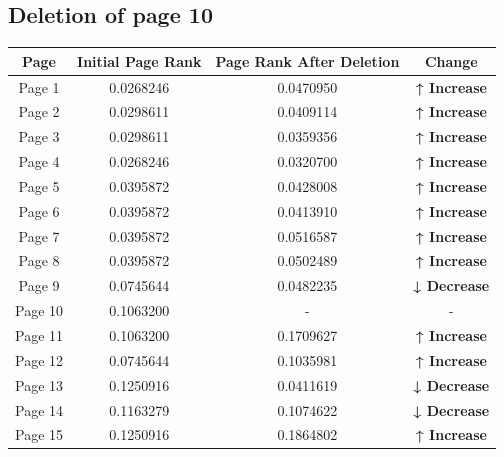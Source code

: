 \documentclass{article}
\begin{document}
\subsection{Deletion of page 10}
\vspace{0.3cm}

\begin{tabular}{|c|c|c|c|}
\hline
\textbf{Page} & \textbf{Initial Page Rank} & Page Rank After Deletion & \textbf{Change} \\
\hline
Page 1 & 0.0268246 & 0.0470950 & \textbf{↑ Increase} \\
\hline
Page 2 & 0.0298611 & 0.0409114 & \textbf{↑ Increase} \\
\hline
Page 3 & 0.0298611 & 0.0359356 & \textbf{↑ Increase} \\
\hline
Page 4 & 0.0268246 & 0.0320700 & \textbf{↑ Increase} \\
\hline
Page 5 & 0.0395872 & 0.0428008 & \textbf{↑ Increase} \\
\hline
Page 6 & 0.0395872 & 0.0413910 & \textbf{↑ Increase} \\
\hline
Page 7 & 0.0395872 & 0.0516587 & \textbf{↑ Increase} \\
\hline
Page 8 & 0.0395872 & 0.0502489 & \textbf{↑ Increase} \\
\hline
Page 9 & 0.0745644 & 0.0482235 & \textbf{↓ Decrease} \\
\hline
Page 10 & 0.1063200 & - & - \\
\hline
Page 11 & 0.1063200 & 0.1709627 & \textbf{↑ Increase} \\
\hline
Page 12 & 0.0745644 & 0.1035981 & \textbf{↑ Increase} \\
\hline
Page 13 & 0.1250916 & 0.0411619 & \textbf{↓ Decrease} \\
\hline
Page 14 & 0.1163279 & 0.1074622 & \textbf{↓ Decrease} \\
\hline
Page 15 & 0.1250916 & 0.1864802 & \textbf{↑ Increase} \\
\hline
\end{tabular}
\end{document}

